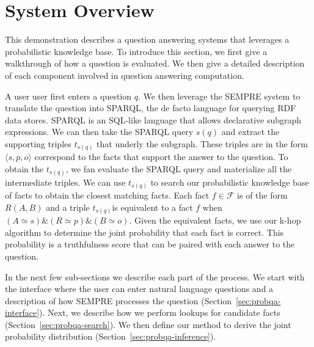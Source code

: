 
\section{System Overview}

This demonstration describes a question answering systems that leverages a probabilistic knowledge base.
To introduce this section, we first give a walkthrough of how a question is evaluated.
We then give a detailed description of each component involved in question answering computation.




A user user first enters a question \(q\). 
We then leverage the SEMPRE system to translate the question into SPARQL, the de facto language for querying RDF data stores.
SPARQL is an SQL-like language that allows declarative subgraph expressions.
We can then take the SPARQL query $s(q)$ and extract the supporting triples \(t_{s(q)}\) that underly the subgraph.
These triples are in the form \(\langle s, p, o \rangle\) correspond to the facts that support the answer to the question.
To obtain the \(t_{s(q)}\), we fan evaluate the SPARQL query and materialize all the intermediate triples.
We can use \(t_{s(q)}\) to search our probabilistic knowledge base of facts to obtain the closest matching facts.
Each fact \(f \in \mathcal{F}\) is of the form \(R(A,B)\) and a triple \(t_{s(q)}\)is equivalent to a fact \(f\) when 
\((A \simeq s) \& (R \simeq p) \& (B \simeq o)\).
Given the equivalent facts, we use our k-hop algorithm to determine the joint probability that each fact is correct.
This probability is a truthfulness score that can be paired with each answer to the question.

In the next few sub-sections we describe each part of the process. We start
with the interface where the user can enter natural language questions and a
description of how SEMPRE processes the question (Section~\ref{sec:probqa-interface}).
Next, we describe how we perform lookups for candidate facts (Section~\ref{sec:probqa-search}).
We then define our method to derive the joint probability distribution (Section~\ref{sec:probqa-inference}).


